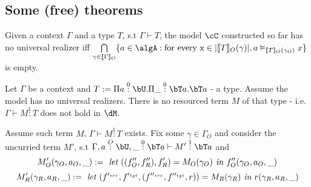 \documentclass[12pt,a4paper]{article}
\def\src{_{src}}
\def\rfl{_{refl}}
\def\tgt{_{tgt}}
\renewcommand{\O}{_{O}}\alwaysmath{O}
\newcommand{\R}{\ensuremath{_{R}}}
\begin{document}
\subsection{Some (free) theorems}
%

\begin{definition}
  Given a context $\Gamma$ and a type $T$, s.t $\Gamma \vdash  T$, the model $\cC$ constructed so far has no universal realizer iff $\bigcap\limits_{\gamma \in \llbracket\Gamma\rrbracket\O} \{ a \in \algA :  \text{for every x} \in \carr{\llbracket T\rrbracket \O(\gamma)}, a \vDash_{\llbracket T \rrbracket \O(\gamma\O)} x\}$ is empty.
\end{definition}

\begin{thm}
  Let $\Gamma$ be a context and $T \define \Pi a \overset{0}{:} \bU . \Pi \_ \overset{0}{:} \bT a . \bT a$  - a type. Assume the model has no universal realizers. There is no resourced term $M$ of that type - i.e. $\Gamma \vdash M \overset{1}{:} T$ does not hold in $\dM$.
\end{thm}

Assume such term $M$, $\Gamma \vdash M \overset{1}{:} T$ exists. Fix some $\gamma \in \Gamma\O$ and consider the uncurried term $M'$, s.t $\Gamma, a \overset{O}{:} \bU, \_ \overset{0}: \bT a \vdash M' \overset{1}{:} \bT a$ and
$$ M'\O(\gamma\O, a\O, \_) \define \textit{ let } ((f''\O, f''\R) , f'\R)= M\O(\gamma\O) \textit{ in } f''\O(\gamma\O, a\O, \_)$$
$$ M'\R(\gamma\R, a\R, \_) \define \textit{ let } (f'^{\src}, f'^{\tgt}, (f''^{\src}, f''^{\tgt}, r)) = M\R(\gamma\R) \textit{ in } r(\gamma\R, a\R, \_)$$
\end{document}
